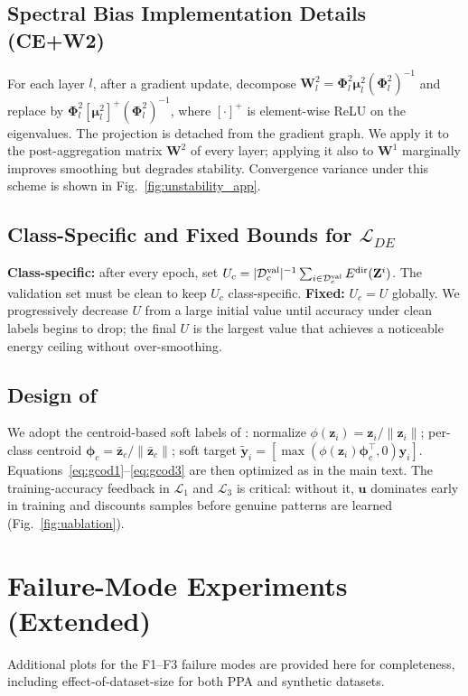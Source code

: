 \subsection{Spectral Bias Implementation Details (CE+W2)}
\label{app:weights_eigens}
For each layer $l$, after a gradient update, decompose $\mathbf{W}_l^2=\bm{\Phi}_l^2\bm{\mu}_l^2(\bm{\Phi}_l^2)^{-1}$ and replace by $\bm{\Phi}_l^2[\bm{\mu}_l^2]^+(\bm{\Phi}_l^2)^{-1}$, where $[\cdot]^+$ is element-wise ReLU on the eigenvalues. The projection is detached from the gradient graph. We apply it to the post-aggregation matrix $\mathbf{W}^2$ of every layer; applying it also to $\mathbf{W}^1$ marginally improves smoothing but degrades stability. Convergence variance under this scheme is shown in Fig.~\ref{fig:unstability_app}.

\subsection{Class-Specific and Fixed Bounds for $\mathcal{L}_{DE}$}
\label{appendix:details_dirichlet_regularization_bounds}
\textbf{Class-specific:} after every epoch, set $U_c=|\mathcal{D}^{\text{val}}_c|^{-1}\sum_{i\in\mathcal{D}^{\text{val}}_c}E^{\text{dir}}(\mathbf{Z}^i)$. The validation set must be clean to keep $U_c$ class-specific.
\textbf{Fixed:} $U_c=U$ globally. We progressively decrease $U$ from a large initial value until accuracy under clean labels begins to drop; the final $U$ is the largest value that achieves a noticeable energy ceiling without over-smoothing.

\subsection{Design of \method{}}
\label{app:gcod}
We adopt the centroid-based soft labels of \citet{wani2023combining}: normalize $\phi(\mathbf{z}_i)=\mathbf{z}_i/\|\mathbf{z}_i\|$; per-class centroid $\bm{\phi}_c=\bar{\mathbf{z}}_c/\|\bar{\mathbf{z}}_c\|$; soft target $\tilde{\mathbf{y}}_i=[\max(\phi(\mathbf{z}_i)\bm{\phi}_c^\top,0)\mathbf{y}_i]$. Equations~\eqref{eq:gcod1}--\eqref{eq:gcod3} are then optimized as in the main text. The training-accuracy feedback in $\mathcal{L}_1$ and $\mathcal{L}_3$ is critical: without it, $\mathbf{u}$ dominates early in training and discounts samples before genuine patterns are learned (Fig.~\ref{fig:uablation}).

\section{Failure-Mode Experiments (Extended)}
\label{app:failure_modes_extra}
Additional plots for the F1--F3 failure modes are provided here for completeness, including effect-of-dataset-size for both PPA and synthetic datasets.

